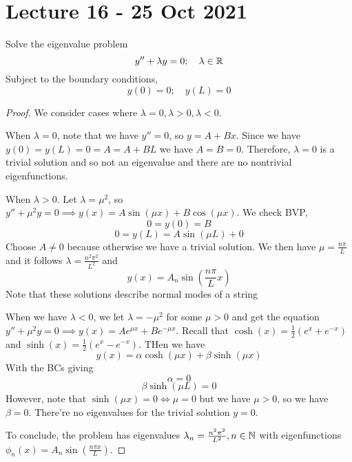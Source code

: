\section{Lecture 16 - 25 Oct 2021}
\begin{example}
  Solve the eigenvalue problem
  \[y'' + \lambda y=0 ; \quad \lambda\in\mathbb R\]
  Subject to the boundary conditions,
  \[y(0)=0; \quad y(L)=0\]
\end{example}
\begin{proof}
  We consider cases where $\lambda=0, \lambda>0, \lambda<0$.

  When $\lambda =0$, note that we have $y''=0$, so $y=A+Bx$. Since we have $y(0)=y(L)=0= A
  = A+BL$ we have $A=B=0$.
  Therefore, $\lambda=0$ is a trivial solution and so not an eigenvalue and there are no
  nontrivial eigenfunctions.

  When $\lambda>0$. Let $\lambda=\mu^2$, so $y''+\mu^2y=0 \implies y(x)=A\sin(\mu
  x)+B\cos(\mu x)$. We check BVP,
  \[0= y(0) = B\]
  \[0=y(L)= A\sin (\mu L) + 0\]
  Choose $A\neq 0$ because otherwise we have a trivial solution. We then have
  $\mu=\frac{n\pi}{L}$ and it follows $\lambda=\frac{n^2\pi^2}{L^2}$ and 
  \[y(x)= A_n \sin (\frac{n\pi}{L}x)\]
  Note that these solutions describe normal modes of a string

  When we have $\lambda<0$, we let $\lambda=-\mu^2$ for some $\mu>0$ and get the equation
  $y''+\mu^2 y = 0 \implies y(x)=Ae^{\mu x} + Be^{-\mu x}$.
  Recall that $\cosh(x)=\frac{1}{2}(e^{x}+ e^{-x})$ and
  $\sinh(x)=\frac{1}{2}(e^{x}-e^{-x}).$ THen we have 
  \[y(x)=\alpha\cosh(\mu x) + \beta\sinh(\mu x)\]
  With the BCs giving 
  \[\alpha=0\]
  \[\beta\sinh(\mu L)=0\]
  However, note that $\sinh(\mu x)=0 \iff \mu =0$ but we have $\mu>0$, so we have
  $\beta=0$. There're no eigenvalues for the trivial solution $y=0$.

  To conclude, the problem has eigenvalues $\lambda_n=\frac{n^2\pi^2}{L^2}, n\in\mathbb N$ with
  eigenfunctions $\phi_n(x)=A_n\sin(\frac{n\pi x}{L})$.
\end{proof}

